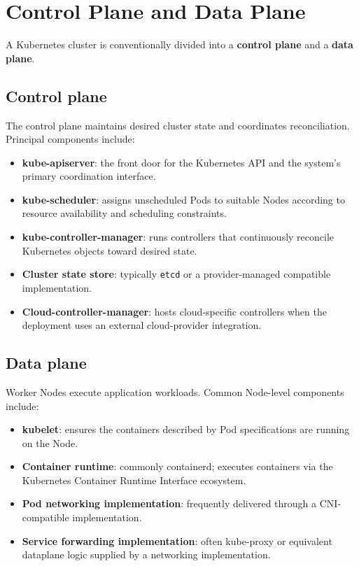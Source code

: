 \documentclass[11pt]{article}
\newcommand{\term}[1]{\textbf{\textcolor{KubeBlue}{#1}}}
\newcommand{\code}[1]{\texttt{#1}}
\begin{document}
\section{Control Plane and Data Plane}

A Kubernetes cluster is conventionally divided into a \term{control plane} and a \term{data plane}.

\subsection{Control plane}
The control plane maintains desired cluster state and coordinates reconciliation. Principal components include:

\begin{itemize}
  \item \textbf{kube-apiserver}: the front door for the Kubernetes API and the system's primary coordination interface.
  \item \textbf{kube-scheduler}: assigns unscheduled Pods to suitable Nodes according to resource availability and scheduling constraints.
  \item \textbf{kube-controller-manager}: runs controllers that continuously reconcile Kubernetes objects toward desired state.
  \item \textbf{Cluster state store}: typically \code{etcd} or a provider-managed compatible implementation.
  \item \textbf{Cloud-controller-manager}: hosts cloud-specific controllers when the deployment uses an external cloud-provider integration.
\end{itemize}

\subsection{Data plane}
Worker Nodes execute application workloads. Common Node-level components include:

\begin{itemize}
  \item \textbf{kubelet}: ensures the containers described by Pod specifications are running on the Node.
  \item \textbf{Container runtime}: commonly containerd; executes containers via the Kubernetes Container Runtime Interface ecosystem.
  \item \textbf{Pod networking implementation}: frequently delivered through a CNI-compatible implementation.
  \item \textbf{Service forwarding implementation}: often kube-proxy or equivalent dataplane logic supplied by a networking implementation.
\end{itemize}
\end{document}

